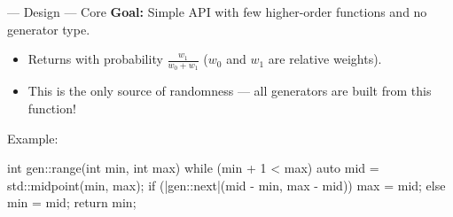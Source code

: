 \begin{frame}[t,fragile]{\halcheck{} --- Design --- Core}
  \textbf{Goal:} Simple API with few higher-order functions and no generator type.
  \begin{center}
  \end{center}

  \begin{overprint}
    \begin{itemize}
      \item Returns  with probability $\frac{w_1}{w_0 + w_1}$ ($w_0$ and $w_1$ are relative weights).
      \item<3> This is the \alert{only} source of randomness --- all generators are built from this function!
    \end{itemize}

    \vspace{-1em}
    \begin{block}{Example:}
      \begin{cppcode}
      int gen::range(int min, int max) {
        while (min + 1 < max) {
          auto mid = std::midpoint(min, max);
          if (|\alert{gen::next}|(mid - min, max - mid))
            max = mid;
          else
            min = mid; }
        return min; }
    \end{cppcode}
    \end{block}
  \end{overprint}
\end{frame}

